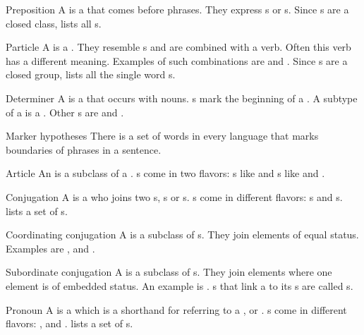 \begin{df}{Preposition}
A \sb{} is a  that comes before  phrases. They express s or s. Since \sb{}s are a closed class,  lists all \sb{}s.
\end{df}
\begin{df}{Particle}
A \sb{} is a . They resemble s and are combined with a verb. Often this verb has a different meaning. Examples of such combinations are  and . Since \sb{}s are a closed group,  lists all the single word \sb{}s.
\end{df}
\begin{df}{Determiner}
A \sb{} is a  that occurs with nouns. \sb{}s mark the beginning of a . A subtype of a \sb{} is a . Other \sb{}s are  and .
\end{df}
\begin{tm}{Marker hypotheses}
There is a set of words in every language that marks boundaries of phrases in a sentence.
\end{tm}
\begin{df}{Article}
An \sb{} is a subclass of a . \sb{}s come in two flavors: s like  and s like  and .
\end{df}
\begin{df}{Conjugation}
A \sb{} is a  who joins two s, s or s. \sb{}s come in different flavors: s and s.  lists a set of \sb{}s.
\end{df}
\begin{df}{Coordinating conjugation}
A \sb{} is a subclass of s. They join elements of equal status. Examples are ,  and .
\end{df}
\begin{df}{Subordinate conjugation}
A \sb{} is a subclass of s. They join elements where one element is of embedded status. An example is . \sb{}s that link a  to its s are called s.
\end{df}
\begin{df}{Pronoun}
A \sb{} is a  which is a shorthand for referring to a ,  or . \sb{}s come in different flavors: ,  and .  lists a set of \sb{}s.
\end{df}
